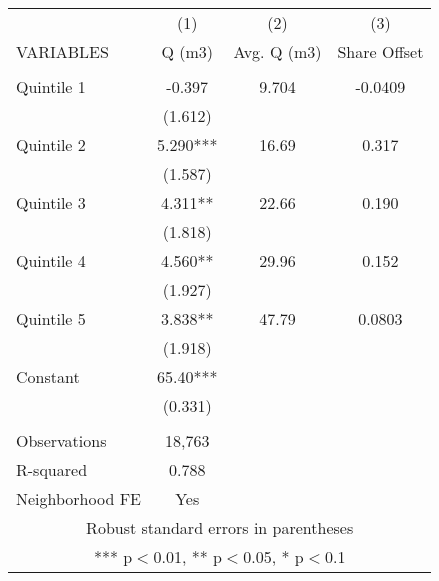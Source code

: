 \begin{tabular}{lccc} \hline
 & (1) & (2) & (3) \\
VARIABLES & Q (m3) & Avg. Q (m3) & Share Offset \\ \hline
 &  &  &  \\
Quintile 1 & -0.397 & 9.704 & -0.0409 \\
 & (1.612) &  &  \\
Quintile 2 & 5.290*** & 16.69 & 0.317 \\
 & (1.587) &  &  \\
Quintile 3 & 4.311** & 22.66 & 0.190 \\
 & (1.818) &  &  \\
Quintile 4 & 4.560** & 29.96 & 0.152 \\
 & (1.927) &  &  \\
Quintile 5 & 3.838** & 47.79 & 0.0803 \\
 & (1.918) &  &  \\
Constant & 65.40*** &  &  \\
 & (0.331) &  &  \\
 &  &  &  \\
Observations & 18,763 &  &  \\
R-squared & 0.788 &  &  \\
 Neighborhood FE & Yes &  &  \\ \hline
\multicolumn{4}{c}{ Robust standard errors in parentheses} \\
\multicolumn{4}{c}{ *** p$<$0.01, ** p$<$0.05, * p$<$0.1} \\
\end{tabular}
